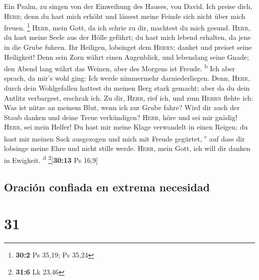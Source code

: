  Ein Psalm, zu singen von der Einweihung des Hauses, von
David.  Ich preise dich, \textsc{Herr}; denn du hast mich
erhöht und lässest meine Feinde sich nicht über mich freuen. \footnote{\textbf{30:2}
  Ps 35,19; Ps 35,24}  \textsc{Herr}, mein Gott, da ich
schrie zu dir, machtest du mich gesund.  \textsc{Herr}, du
hast meine Seele aus der Hölle geführt; du hast mich lebend erhalten, da
jene in die Grube fuhren.  Ihr Heiligen, lobsinget dem
\textsc{Herrn}; danket und preiset seine Heiligkeit!  Denn
sein Zorn währt einen Augenblick, und lebenslang seine Gnade; den Abend
lang währt das Weinen, aber des Morgens ist Freude. \textsuperscript{b}
 Ich aber sprach, da mir's wohl ging: Ich werde nimmermehr
darniederliegen.  Denn, \textsc{Herr}, durch dein
Wohlgefallen hattest du meinen Berg stark gemacht; aber da du dein
Antlitz verbargest, erschrak ich.  Zu dir, \textsc{Herr},
rief ich, und zum \textsc{Herrn} flehte ich:  Was ist
nütze an meinem Blut, wenn ich zur Grube fahre? Wird dir auch der Staub
danken und deine Treue verkündigen?  \textsc{Herr}, höre
und sei mir gnädig! \textsc{Herr}, sei mein Helfer!  Du
hast mir meine Klage verwandelt in einen Reigen; du hast mir meinen Sack
ausgezogen und mich mit Freude gegürtet, \textsuperscript{c}
 auf dass dir lobsinge meine Ehre und nicht stille werde.
\textsc{Herr}, mein Gott, ich will dir danken in Ewigkeit.
\textsuperscript{d} \footnote{\textbf{31:6} Lk 23,46}{[}\textbf{30:13}
Ps 16,9{]}

\hypertarget{oraciuxf3n-confiada-en-extrema-necesidad}{%
\subsection{Oración confiada en extrema
necesidad}\label{oraciuxf3n-confiada-en-extrema-necesidad}}

\hypertarget{section-30}{%
\section{31}\label{section-30}}


